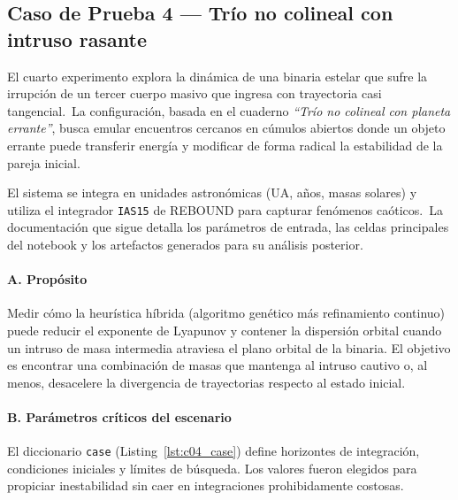 \subsection{Caso de Prueba 4 — Trío no colineal con intruso rasante}

El cuarto experimento explora la dinámica de una binaria estelar que sufre la irrupción de un tercer cuerpo masivo que ingresa con trayectoria casi tangencial.\ La configuración, basada en el cuaderno \emph{``Trío no colineal con planeta errante''}, busca emular encuentros cercanos en cúmulos abiertos donde un objeto errante puede transferir energía y modificar de forma radical la estabilidad de la pareja inicial.

El sistema se integra en unidades astronómicas (UA, años, masas solares) y utiliza el integrador \texttt{IAS15} de REBOUND para capturar fenómenos caóticos.\ La documentación que sigue detalla los parámetros de entrada, las celdas principales del notebook y los artefactos generados para su análisis posterior.

\paragraph{A. Propósito}
Medir cómo la heurística híbrida (algoritmo genético más refinamiento continuo) puede reducir el exponente de Lyapunov y contener la dispersión orbital cuando un intruso de masa intermedia atraviesa el plano orbital de la binaria. El objetivo es encontrar una combinación de masas que mantenga al intruso cautivo o, al menos, desacelere la divergencia de trayectorias respecto al estado inicial.

\paragraph{B. Parámetros críticos del escenario}
El diccionario \texttt{case} (Listing~\ref{lst:c04_case}) define horizontes de integración, condiciones iniciales y límites de búsqueda. Los valores fueron elegidos para propiciar inestabilidad sin caer en integraciones prohibidamente costosas.

